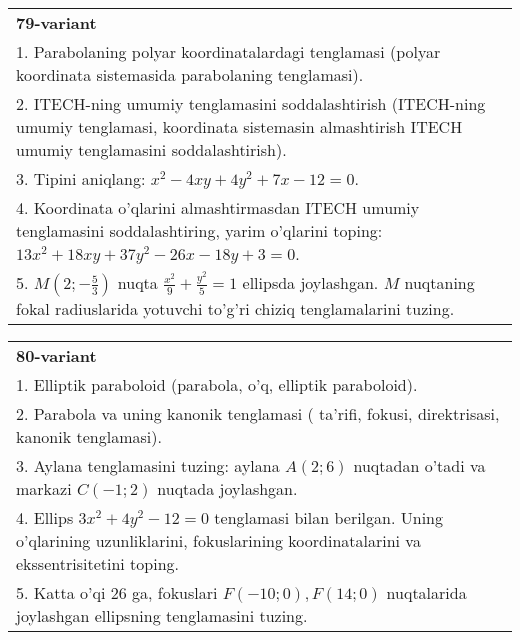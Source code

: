 \documentclass{article}
\begin{document}
\begin{tabular}{m{17cm}}
\textbf{79-variant}\\
1. Parabolaning polyar koordinatalardagi tenglamasi (polyar koordinata sistemasida parabolaning tenglamasi).\\

2. ITECH-ning umumiy tenglamasini soddalashtirish (ITECH-ning umumiy tenglamasi, koordinata sistemasin almashtirish ITECH umumiy tenglamasini soddalashtirish).\\

3. Tipini aniqlang: $x^{2}-4xy+4y^{2}+7x-12=0$.\\

4. Koordinata o'qlarini almashtirmasdan ITECH umumiy tenglamasini soddalashtiring, yarim o'qlarini toping: $13x^{2} + 18xy + 37y^{2} - 26x - 18y + 3 = 0$.  \\

5. $M(2; - \frac{5}{3})$ nuqta $\frac{x^{2}}{9} + \frac{y^{2}}{5} = 1$ ellipsda joylashgan. $M$ nuqtaning fokal radiuslarida yotuvchi to'g'ri chiziq tenglamalarini tuzing.  
\end{tabular}
\vspace{1cm}


\begin{tabular}{m{17cm}}
\textbf{80-variant}\\
1. Elliptik paraboloid (parabola, o'q, elliptik paraboloid).\\

2. Parabola va uning kanonik tenglamasi ( ta'rifi, fokusi, direktrisasi, kanonik tenglamasi).\\

3. Aylana tenglamasini tuzing: aylana $A(2;6)$ nuqtadan o'tadi va markazi $C(-1;2)$ nuqtada joylashgan.\\

4. Ellips $3x^{2} + 4y^{2} - 12 = 0$ tenglamasi bilan berilgan. Uning o'qlarining uzunliklarini, fokuslarining koordinatalarini va ekssentrisitetini toping.  \\

5. Katta o'qi 26 ga, fokuslari $F( - 10;0), F(14;0)$ nuqtalarida joylashgan ellipsning tenglamasini tuzing.  
\end{tabular}
\vspace{1cm}
\end{document}
